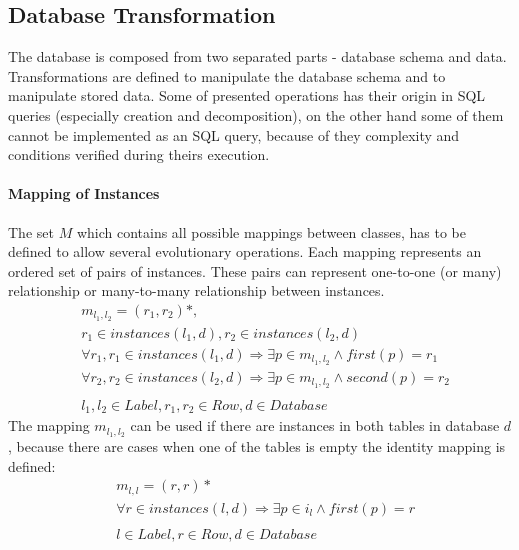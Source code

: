 \documentclass[11pt]{article}
\begin{document}
\subsection{Database Transformation}
The database is composed from two separated parts - database schema and data. Transformations are defined to manipulate the database schema and to manipulate stored data. Some of presented operations has their origin in SQL queries (especially creation and decomposition), on the other hand some of them cannot be implemented as an SQL query, because of they complexity and conditions verified during theirs execution.

\paragraph{Mapping of Instances} The set $M$ which contains all possible mappings between classes, has to be defined to allow several evolutionary operations. Each mapping represents an ordered set of pairs of instances. These pairs can represent one-to-one (or many) relationship or many-to-many relationship between instances. \begin{align*}
&	m_{l_1, l_2} =  (r_1, r_2)*,\\
& 	r_1 \in instances(l_1, d), r_2 \in instances(l_2, d) \\
&	\forall r_1, r_1 \in instances(l_1, d) \Rightarrow \exists p \in m_{l_1, l_2} \wedge first(p) = r_1 \\
&	\forall r_2, r_2 \in instances(l_2, d) \Rightarrow \exists p \in m_{l_1, l_2} \wedge second(p) = r_2\\\\
&	l_1, l_2 \in Label, r_1, r_2 \in Row, d \in Database
\end{align*}
The mapping $m_{l_1, l_2}$ can be used if there are instances in both tables in database $d$, because there are cases when one of the tables is empty the identity mapping is defined:
\begin{align*}
&	m_{l, l} = (r, r) * \\
& 	\forall r \in instances(l, d) \Rightarrow \exists p \in i_{l} \wedge first(p) = r \\\\
&	l \in Label, r \in Row,  d \in Database
\end{align*}
\end{document}
